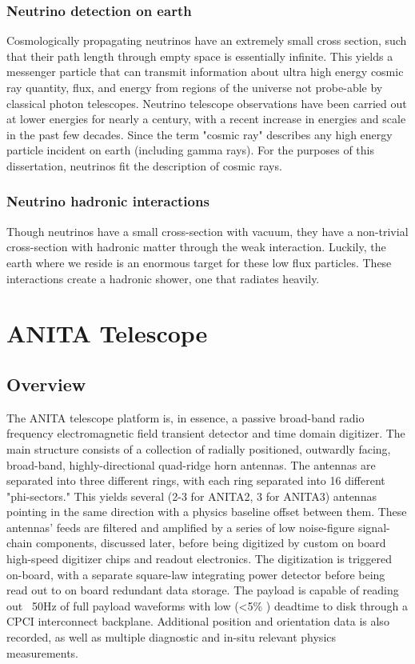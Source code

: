 \subsection{Neutrino detection on earth}
		Cosmologically propagating neutrinos have an extremely small cross section, such that their path length through empty space is essentially infinite.  This yields a messenger particle that can transmit information about ultra high energy cosmic ray quantity, flux, and energy from regions of the universe not probe-able by classical photon telescopes.  Neutrino telescope observations have been carried out at lower energies for nearly a century, with a recent increase in energies and scale in the past few decades.  Since the term "cosmic ray" describes any high energy particle incident on earth (including gamma rays).  For the purposes of this dissertation, neutrinos fit the description of cosmic rays.
	\subsection{Neutrino hadronic interactions}
		Though neutrinos have a small cross-section with vacuum, they have a non-trivial cross-section with hadronic matter through the weak interaction.  Luckily, the earth where we reside is an enormous target for these low flux particles.  These interactions create a hadronic shower, one that radiates heavily.


\chapter{ANITA Telescope}
\section{Overview}
	The ANITA telescope platform is, in essence, a passive broad-band radio frequency electromagnetic field transient detector and time domain digitizer.  The main structure consists of a collection of radially positioned, outwardly facing, broad-band, highly-directional quad-ridge horn antennas.  The antennas are separated into three different rings, with each ring separated into 16 different "phi-sectors."  This yields several (2-3 for ANITA2, 3 for ANITA3) antennas pointing in the same direction with a physics baseline offset between them. These antennas' feeds are filtered and amplified by a series of low noise-figure signal-chain components, discussed later, before being digitized by custom on board high-speed digitizer chips and readout electronics.  The digitization is triggered on-board, with a separate square-law integrating power detector before being read out to on board redundant data storage.  The payload is capable of reading out ~50Hz of full payload waveforms with low (\textless 5\% ) deadtime to disk through a CPCI interconnect backplane.  Additional position and orientation data is also recorded, as well as multiple diagnostic and in-situ relevant physics measurements.	
	
